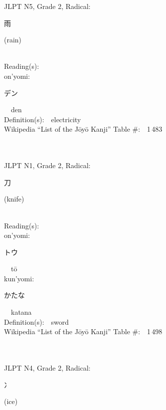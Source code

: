 \begin{multicols}{2}
{JLPT N5, Grade 2, Radical:\ \ {\begin{CJK}{UTF8}{min} 雨 \end{CJK}} (rain) } \\
Reading(s):\ \ \\
{\hspace*{1em}}on'yomi:\ \ \\
{\hspace*{2em}}{\begin{CJK}{UTF8}{min} デン \end{CJK}}\ \ den\ \ \\
Definition(s):\ \ electricity \\
Wikipedia ``List of the J\=oy\=o Kanji'' Table \#:\ \ 1\,483 \\
\ \ \\
{\fontsize{34pt}{40pt}  }\ \ \\  %
{JLPT N1, Grade 2, Radical:\ \ {\begin{CJK}{UTF8}{min} 刀 \end{CJK}} (knife) } \\
Reading(s):\ \ \\
{\hspace*{1em}}on'yomi:\ \ \\
{\hspace*{2em}}{\begin{CJK}{UTF8}{min} トウ \end{CJK}}\ \ t\=o\ \ \\
{\hspace*{1em}}kun'yomi:\ \ \\
{\hspace*{2em}}{\begin{CJK}{UTF8}{min} かたな \end{CJK}}\ \ katana\ \ \\
Definition(s):\ \ sword \\
Wikipedia ``List of the J\=oy\=o Kanji'' Table \#:\ \ 1\,498 \\
\ \ \\
{\fontsize{34pt}{40pt}  }\ \ \\  %
{JLPT N4, Grade 2, Radical:\ \ {\begin{CJK}{UTF8}{min} 冫 \end{CJK}} (ice) } \\

\end{multicols}
